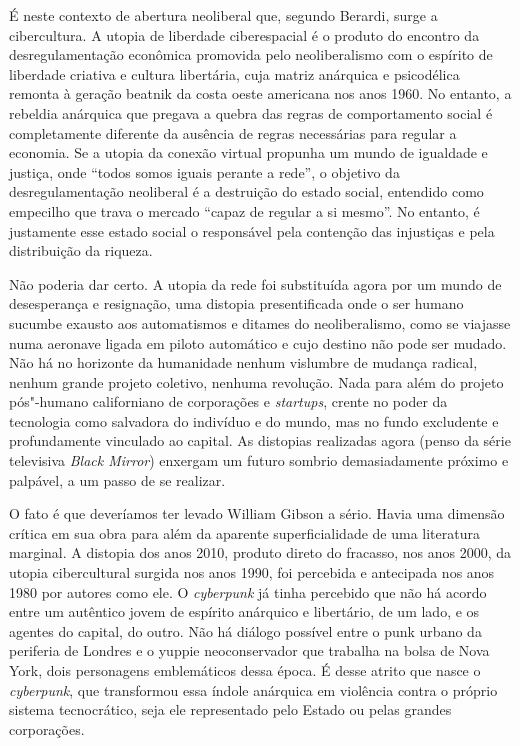 É neste contexto de abertura neoliberal que,
segundo Berardi, surge a cibercultura. A utopia de liberdade
ciberespacial é o produto do encontro da desregulamentação econômica
promovida pelo neoliberalismo com o espírito de liberdade criativa e
cultura libertária, cuja matriz anárquica e psicodélica remonta à
geração beatnik da costa oeste americana nos anos 1960.
No entanto, a rebeldia anárquica que pregava a quebra das regras de
comportamento social é completamente diferente da ausência de regras
necessárias para regular a economia. Se a utopia da conexão virtual
propunha um mundo de igualdade e justiça, onde ``todos somos iguais
perante a rede'', o objetivo da desregulamentação neoliberal é a
destruição do estado social, entendido como empecilho que trava o
mercado ``capaz de regular a si mesmo''. No entanto, é justamente esse
estado social o responsável pela contenção das injustiças e pela
distribuição da riqueza.

Não poderia dar certo. A utopia da rede foi substituída agora por um
mundo de desesperança e resignação, uma distopia presentificada onde o
ser humano sucumbe exausto aos automatismos e ditames do neoliberalismo,
como se viajasse numa aeronave ligada em piloto automático e cujo
destino não pode ser mudado. Não há no horizonte da humanidade nenhum
vislumbre de mudança radical, nenhum grande projeto coletivo, nenhuma
revolução. Nada para além do projeto pós"-humano californiano de corporações e \emph{startups}, crente no poder da tecnologia como salvadora do indivíduo e do mundo, mas no fundo excludente e profundamente vinculado ao capital. As distopias realizadas agora (penso da série televisiva
\emph{Black Mirror}) enxergam um futuro sombrio demasiadamente próximo e
palpável, a um passo de se realizar.

O fato é que deveríamos ter levado William Gibson a sério. Havia uma dimensão crítica em sua obra para além da aparente superficialidade de uma literatura marginal. A distopia dos anos 2010, produto direto do fracasso, nos anos 2000, da
utopia cibercultural surgida nos anos 1990, foi percebida e antecipada
nos anos 1980 por autores como ele. O \emph{cyberpunk} já tinha percebido que não há acordo
entre um autêntico jovem de espírito anárquico e libertário, de um lado, e os
agentes do capital, do outro. Não há diálogo possível entre o punk
urbano da periferia de Londres e o yuppie neoconservador que trabalha na
bolsa de Nova York, dois personagens emblemáticos dessa época. É desse
atrito que nasce o \emph{cyberpunk}, que transformou essa índole
anárquica em violência contra o próprio sistema tecnocrático, seja ele
representado pelo Estado ou pelas grandes corporações.

